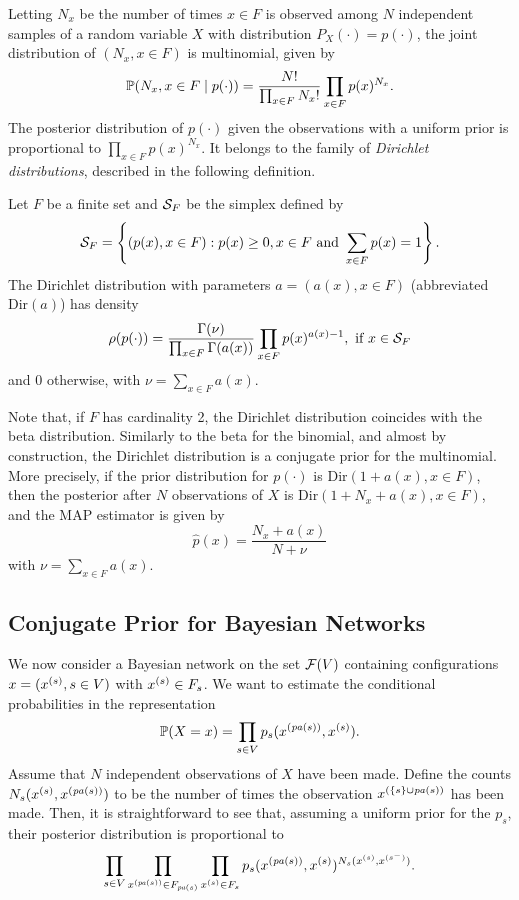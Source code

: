 Letting $N_x$ be the number of times $x\in F$ is observed among $N$
independent samples of a random variable $X$ with distribution $P_X(\cdot)=p(\cdot)$,
the joint distribution of $(N_x,x\in F)$ is multinomial, given by
$$
\bm{\mathbb P}(N_x, x\in F\mid p(\cdot)) = \frac{N!}{\prod_{x\in F} N_x!} \prod_{x\in F}
p(x)^{N_x}.
$$
The posterior distribution of $p(\cdot)$ given the observations with a
uniform prior is proportional to $\prod_{x\in F}
p(x)^{N_x}$. It belongs to the family of {\em Dirichlet distributions},
described in the following definition.
\begin{definition}
\label{def:dirich}
Let $F$ be a finite set and ${\mathcal S}_F$ be the simplex defined by
$$
{\mathcal S}_F = \left\{ (p(x), x\in F): p(x)\geq 0, x\in F \text{ and } \sum_{x\in F}
p(x) = 1 \right\}.
$$
The Dirichlet distribution with parameters $a = (a(x), x\in F)$
(abbreviated $\mathrm{Dir}(a)$) has density
 $$
\rho(p(\cdot)) = \frac{\Gamma(\nu)}{\prod_{x\in F} \Gamma(a(x))} \prod_{x\in F}
p(x)^{a(x)-1}, \text{ if } x\in {\mathcal S}_F
$$
and 0 otherwise, with $\nu = \sum_{x\in F} a(x)$.
\end{definition}
Note that, if $F$ has cardinality 2, the Dirichlet distribution
coincides with the beta distribution. Similarly to the beta for the
binomial, and almost by construction, the Dirichlet distribution is a
conjugate prior for the multinomial. More precisely, if the prior
distribution for $p(\cdot)$ is $\mathrm{Dir}(1+a(x), x\in F)$, then the
posterior after $N$ observations of $X$ is $\mathrm{Dir}(1+N_x+a(x),
x\in F)$, and the MAP estimator is given by
$$
\hat p(x) = \frac{N_x+a(x)}{N+\nu}
$$
with $\nu= \sum_{x\in F} a(x)$. 

\subsection{Conjugate Prior for Bayesian Networks}
We now consider a Bayesian network on the set ${\mathcal F}(V)$ containing configurations $x = (x^{(s)}, s\in V)$ with $x^{(s)}\in F_s$.
We want to estimate the conditional probabilities
in the representation
$$
\bm{\mathbb P}(X=x) = \prod_{s\in V} p_s(x^{({\mathit{pa}(s)})}, x^{(s)}).
$$
Assume that $N$ independent observations of $X$ have been made. Define
the counts $N_s(x^{(s)},  x^{({\mathit{pa}(s)})})$ to be the number of times the observation
$x^{(\{s\}\cup {\mathit{pa}(s)})}$ has been made. Then, it is straightforward to see
that, assuming a uniform prior for the $p_s$, their posterior
distribution is proportional to
$$
\prod_{s\in V} \prod_{x^{({\mathit{pa}(s)})}\in F_{{\mathit{pa}(s)}}} \prod_{x^{(s)}\in F_s} p_s(
x^{({\mathit{pa}(s)})}, x^{(s)})^{N_s(x^{(s)}, x^{(s^{-})})}.
$$

